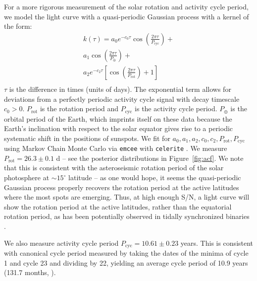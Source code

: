 For a more rigorous measurement of the solar rotation and activity cycle period, we model the light curve with a quasi-periodic Gaussian process with a kernel of the form: 
\begin{equation}
\begin{split}
    k(\tau) = a_0 e^{-c_0 \tau} \cos\left(\frac{2\pi \tau}{P_\mathrm{cyc}}\right) +\\
    a_1 \cos\left(\frac{2\pi \tau}{P_\oplus}\right) + \\ 
    a_2 e^{-c_2 \tau} \left[\cos\left(\frac{2\pi \tau}{P_\mathrm{rot}}\right) + 1 \right] \\ 
\end{split}
\end{equation}
$\tau$ is the difference in times (units of days). The exponential term allows for deviations from a perfectly periodic activity cycle signal with decay timescale $c_0 > 0$. $P_\mathrm{rot}$ is the rotation period and $P_\mathrm{cyc}$ is the activity cycle period. $P_\oplus$ is the orbital period of the Earth, which imprints itself on these data because the Earth's inclination with respect to the solar equator gives rise to a periodic systematic shift in the positions of sunspots. We fit for $a_0, a_1, a_2, c_0, c_2, P_\mathrm{rot}, P_\mathrm{cyc}$ using Markov Chain Monte Carlo via \texttt{emcee} with \texttt{celerite} \citep{Foreman-Mackey2013, Foreman-Mackey2017}. We measure $P_\mathrm{rot}=26.3 \pm 0.1$ d  -- see the posterior distributions in Figure~\ref{fig:acf}. We note that this is consistent with the asteroseismic rotation period of the solar photosphere at $\sim 15^\circ$ latitude \citep{Howe2000} -- as one would hope, it seems the quasi-periodic Gaussian process properly recovers the rotation period at the active latitudes where the most spots are emerging. Thus, at high enough S/N, a light curve will show the rotation period at the active latitudes, rather than the equatorial rotation period, as has been potentially observed in tidally synchronized binaries \citep[see e.g.][]{Lurie2017}. 

We also measure activity cycle period $P_\mathrm{cyc} = 10.61 \pm 0.23$ years. This is consistent with canonical cycle period measured by taking the dates of the minima of cycle 1 and cycle 23 and dividing by 22, yielding an average cycle period of 10.9 years (131.7 months, \citealt{Hathaway2015}). 

